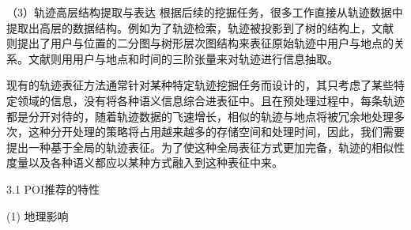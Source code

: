 \documentclass[a4paper,11pt]{article}
\theoremstyle{mytheor}
\begin{document}
（3）轨迹高层结构提取与表达
根据后续的挖掘任务，很多工作直接从轨迹数据中提取出高层的数据结构。例如为了轨迹检索，轨迹被投影到了树的结构上\cite{guttman1984r,wang2008flexible,pfoser2000novel}，文献\cite{zheng2009mining} 则提出了用户与位置的二分图与树形层次图结构来表征原始轨迹中用户与地点的关系。文献\cite{yuan2015discovering,wang2014travel,liu2016unified}则用用户与地点和时间的三阶张量来对轨迹进行信息抽取。


现有的轨迹表征方法通常针对某种特定轨迹挖掘任务而设计的，其只考虑了某些特定领域的信息，没有将各种语义信息综合进表征中。且在预处理过程中，每条轨迹都是分开对待的，随着轨迹数据的飞速增长，相似的轨迹与地点将被冗余地处理多次，这种分开处理的策略将占用越来越多的存储空间和处理时间，因此，我们需要提出一种基于全局的轨迹表征。为了使这种全局表征方式更加完备，轨迹的相似性度量以及各种语义都应以某种方式融入到这种表征中来。




3.1	POI推荐的特性

(1)	地理影响
\end{document}
